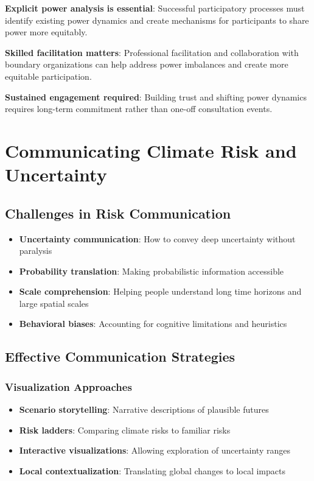 \documentclass[
  letterpaper,
  DIV=11,
  numbers=noendperiod]{scrreprt}
\providecommand{\tightlist}{%
  \setlength{\itemsep}{0pt}\setlength{\parskip}{0pt}}
\begin{document}
\textbf{Explicit power analysis is essential}: Successful participatory
processes must identify existing power dynamics and create mechanisms
for participants to share power more equitably.

\textbf{Skilled facilitation matters}: Professional facilitation and
collaboration with boundary organizations can help address power
imbalances and create more equitable participation.

\textbf{Sustained engagement required}: Building trust and shifting
power dynamics requires long-term commitment rather than one-off
consultation events.

\section{Communicating Climate Risk and
Uncertainty}\label{communicating-climate-risk-and-uncertainty}

\subsection{Challenges in Risk
Communication}\label{challenges-in-risk-communication}

\begin{itemize}
\tightlist
\item
  \textbf{Uncertainty communication}: How to convey deep uncertainty
  without paralysis
\item
  \textbf{Probability translation}: Making probabilistic information
  accessible
\item
  \textbf{Scale comprehension}: Helping people understand long time
  horizons and large spatial scales
\item
  \textbf{Behavioral biases}: Accounting for cognitive limitations and
  heuristics
\end{itemize}

\subsection{Effective Communication
Strategies}\label{effective-communication-strategies}

\subsubsection{Visualization Approaches}\label{visualization-approaches}

\begin{itemize}
\tightlist
\item
  \textbf{Scenario storytelling}: Narrative descriptions of plausible
  futures
\item
  \textbf{Risk ladders}: Comparing climate risks to familiar risks
\item
  \textbf{Interactive visualizations}: Allowing exploration of
  uncertainty ranges
\item
  \textbf{Local contextualization}: Translating global changes to local
  impacts
\end{itemize}
\end{document}
